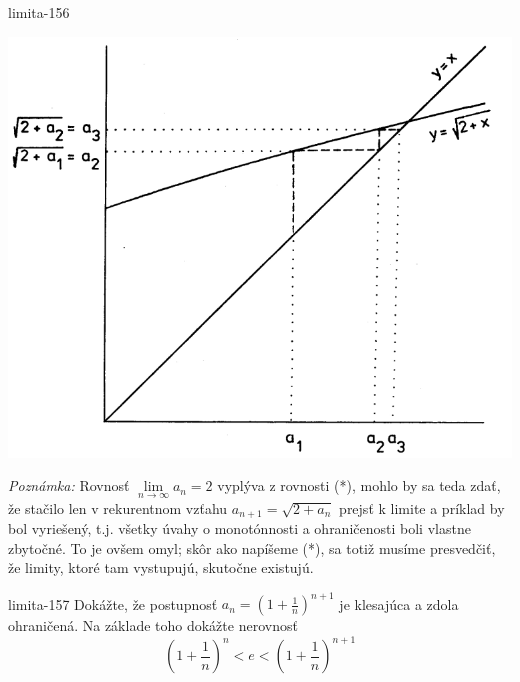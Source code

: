 \begin{defproblem}{limita-156}
\begin{solution}
    \begin{center}
\includegraphics[scale=0.5]{img/pr. 156.png}
\end{center}

    \textit{Poznámka:}
    Rovnosť $\lim\limits_{n \rightarrow \infty} a_n=2$ vyplýva z rovnosti (*),
    mohlo by sa teda zdať, že stačilo len v rekurentnom vzťahu
    $a_{n+1}=\sqrt{2+a_n}$ prejsť k limite a príklad by bol vyriešený, t.j.
    všetky úvahy o monotónnosti a ohraničenosti boli vlastne zbytočné. To je
    ovšem omyl; skôr ako napíšeme (*), sa totiž musíme presvedčiť, že limity,
    ktoré tam vystupujú, skutočne existujú.
\end{solution}
\end{defproblem}

\begin{defproblem}{limita-157}
Dokážte, že postupnosť $a_{n}=(1+\frac{1}{n})^{n+1}$ je klesajúca a zdola
ohraničená. Na základe toho dokážte nerovnosť
\[
    (1+\frac{1}{n})^n<e<(1+\frac{1}{n})^{n+1}
\]
\end{defproblem}

